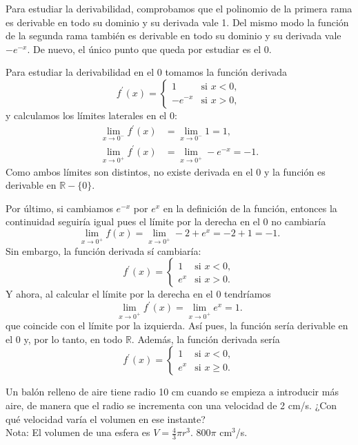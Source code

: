 {Para estudiar la derivabilidad, comprobamos que el polinomio de la primera rama es derivable en todo su dominio y su derivada vale 1. Del mismo modo la función de la segunda rama también es derivable en todo su dominio y su derivada vale $-e^{-x}$. De nuevo, el único punto que queda por estudiar es el 0.

Para estudiar la derivabilidad en el 0 tomamos la función derivada
\[
f^{\prime }(x)=
\begin{cases}
1 & \mbox{si $x<0$}, \\
-e^{-x} & \mbox{si $x>0$},
\end{cases}
\]
y calculamos los límites laterales en el 0:
\begin{align*}
\lim_{x\rightarrow 0^{-}}f^{\prime }(x) &= \lim_{x\rightarrow 0^{-}}1=1, \\
\lim_{x\rightarrow 0^{+}}f^{\prime }(x) &= \lim_{x\rightarrow 0^{+}}-e^{-x}=-1.
\end{align*}
Como ambos límites son distintos, no existe derivada en el 0 y la función es derivable en $\mathbb{R}-\{0\}$.

Por último, si cambiamos $e^{-x}$ por $e^{x}$ en la definición de la función, entonces la continuidad seguiría igual pues el límite por la derecha en el 0 no cambiaría
\[
\lim_{x\rightarrow 0^{+}}f(x) = \lim_{x\rightarrow 0^{+}}-2+e^{x}=-2+1=-1.
\]
Sin embargo, la función derivada sí cambiaría:
\[
f^{\prime }(x)=
\begin{cases}
1 & \mbox{si $x<0$}, \\
e^{x} & \mbox{si $x>0$}.
\end{cases}
\]
Y ahora, al calcular el límite por la derecha en el 0 tendríamos
\[
\lim_{x\rightarrow 0^{+}}f^{\prime }(x) = \lim_{x\rightarrow 0^{+}}e^{x}=1.
\]
que coincide con el límite por la izquierda. Así pues, la función sería derivable en el 0 y, por lo tanto, en todo $\mathbb{R}$.
Además, la función derivada sería
\[
f^{\prime }(x)=
\begin{cases}
1 & \mbox{si $x<0$}, \\
e^{x} & \mbox{si $x\geq 0$}.
\end{cases}
\]
}


{Un balón relleno de aire tiene radio 10 cm cuando se empieza a introducir más aire, de manera que el radio se incrementa con una velocidad de 2 cm/s.
¿Con qué velocidad varía el volumen en ese instante? \\
Nota: El volumen de una esfera es $V=\frac{4}{3}\pi r^3$.
}
{$800\pi$ cm$^3$/s.
}
{
}


